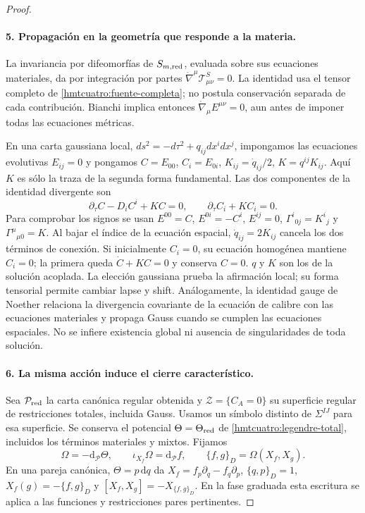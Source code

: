 \begin{proof}
\paragraph{5. Propagación en la geometría que responde a la materia.}
La invariancia por difeomorfías de \(S_{m,\rm red}\), evaluada sobre
sus ecuaciones materiales, da por integración por partes
\(\mathring\nabla^\mu\mathcal T^S_{\mu\nu}=0\). La identidad usa el
tensor completo de \eqref{hmtcuatro:fuente-completa}; no postula
conservación separada de cada contribución.
Bianchi implica entonces
\(\mathring\nabla_\mu E^{\mu\nu}=0\), aun antes de imponer
todas las ecuaciones métricas.

En una carta gaussiana local,
\(ds^2=-d\tau^2+q_{ij}dx^idx^j\), impongamos las ecuaciones
evolutivas \(E_{ij}=0\) y pongamos
\(C=E_{00}\), \(C_i=E_{0i}\),
\(K_{ij}=\dot q_{ij}/2\), \(K=q^{ij}K_{ij}\).
Aquí \(K\) es sólo la traza de la segunda forma fundamental.
Las dos componentes de la identidad divergente son
\begin{equation}
 \partial_\tau C-D_iC^i+KC=0,\qquad
 \partial_\tau C_i+KC_i=0.
 \label{hmtcuatro:propagacion}
\end{equation}
Para comprobar los signos se usan
\(E^{00}=C\), \(E^{0i}=-C^i\), \(E^{ij}=0\),
\(\Gamma^i{}_{0j}=K^i{}_j\) y
\(\Gamma^\mu{}_{\mu0}=K\). Al bajar el índice de la ecuación
espacial, \(\dot q_{ij}=2K_{ij}\) cancela los dos términos de conexión.
Si inicialmente \(C_i=0\), su ecuación homogénea mantiene \(C_i=0\);
la primera queda \(\dot C+KC=0\) y conserva \(C=0\).
\(q\) y \(K\) son los de la solución acoplada. La elección gaussiana
prueba la afirmación local; su forma tensorial permite cambiar lapse
y shift. Análogamente, la identidad gauge de Noether relaciona la
divergencia covariante de la ecuación de calibre con las ecuaciones
materiales y propaga Gauss cuando se cumplen las ecuaciones espaciales.
No se infiere existencia global ni ausencia de singularidades de
toda solución.

\paragraph{6. La misma acción induce el cierre característico.}
Sea \(\mathcal P_{\rm red}\) la carta canónica regular obtenida y
\(\mathcal Z=\{C_A=0\}\) su superficie regular de restricciones
totales, incluida Gauss. Usamos un símbolo distinto de \(\Sigma^{IJ}\)
para esa superficie. Se conserva el potencial \(\Theta=\Theta_{\rm red}\)
de \eqref{hmtcuatro:legendre-total}, incluidos los términos materiales
y mixtos. Fijamos
\begin{equation}
 \Omega=-\mathrm d_{\mathcal P}\Theta,\qquad
 \iota_{X_f}\Omega=\mathrm d_{\mathcal P}f,\qquad
 \{f,g\}_D=\Omega(X_f,X_g).
 \label{hmtcuatro:convenciones-simpecticas}
\end{equation}
En una pareja canónica, \(\Theta=p\,\mathrm dq\) da
\(X_f=f_p\partial_q-f_q\partial_p\), \(\{q,p\}_D=1\),
\(X_f(g)=-\{f,g\}_D\) y
\([X_f,X_g]=-X_{\{f,g\}_D}\). En la fase graduada esta escritura
se aplica a las funciones y restricciones pares pertinentes.


\end{proof}
